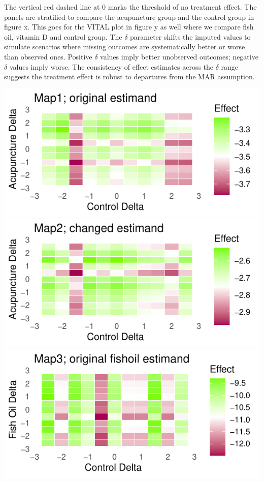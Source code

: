 \documentclass{article}
\newcommand{\pandocbounded}[1]{#1}
\begin{document}
The vertical red dashed line at 0 marks the threshold of no treatment
effect. The panels are stratified to compare the acupuncture group and
the control group in figure x. This goes for the VITAL plot in figure y
as well where we compare fish oil, vitamin D and control group. The
\(\delta\) parameter shifts the imputed values to simulate scenarios
where missing outcomes are systematically better or worse than observed
ones. Positive \(\delta\) values imply better unobserved outcomes;
negative \(\delta\) values imply worse. The consistency of effect
estimates across the \(\delta\) range suggests the treatment effect is
robust to departures from the MAR assumption.

\newpage

\pandocbounded{\includegraphics[keepaspectratio]{Final_Report_files/figure-latex/unnamed-chunk-41-1.pdf}}
\pandocbounded{\includegraphics[keepaspectratio]{Final_Report_files/figure-latex/unnamed-chunk-41-2.pdf}}
\pandocbounded{\includegraphics[keepaspectratio]{Final_Report_files/figure-latex/unnamed-chunk-41-3.pdf}}
\end{document}
